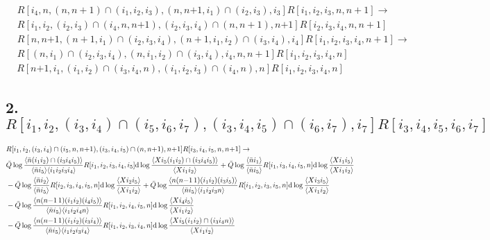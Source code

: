 \documentclass{article}
\begin{document}
\begin{align*}
        &R[i_{4},n,(n,n{+}1)\cap(i_{1},i_{2},i_{3}),(n,n{+1},i_{1})\cap(i_{2},i_{3}),i_{3}] R[i_{1},i_{2},i_{3},n,n{+}1]\to \\
        &R[i_{1},i_{2},(i_{2},i_{3})\cap(i_{4},n,n{+1}),(i_{2},i_{3},i_{4})\cap(n,n{+}1),n{+1}] R[i_{2},i_{3},i_{4},n,n{+}1] 
\end{align*}
\begin{align*}
    &R[n,n{+1},(n{+}1,i_{1})\cap(i_{2},i_{3},i_{4}),(n{+}1,i_{1},i_{2})\cap(i_{3},i_{4}),i_{4}]R[i_{1},i_{2},i_{3},i_{4},n{+}1] \to \\
    &R[(n,i_{1})\cap(i_{2},i_{3},i_{4}),(n,i_{1},i_{2})\cap(i_{3},i_{4}),i_{4},n,n{+}1]R[i_{1},i_{2},i_{3},i_{4},n]
\end{align*}
\begin{align*}
    R[n{+1},i_{1},(i_{1},i_{2})\cap(i_{3},i_{4},n),(i_{1},i_{2},i_{3})\cap(i_{4},n),n] R[i_{1},i_{2},i_{3},i_{4},n]
\end{align*}
\subsection*{2. $R[i_{1},i_{2},(i_{3},i_{4})\cap(i_{5},i_{6},i_{7}),(i_{3},i_{4},i_{5})\cap(i_{6},i_{7}),i_{7}]R[i_{3},i_{4},i_{5},i_{6},i_{7}]$}
\begin{align*}
    &R[i_{1},i_{2},(i_{3},i_{4})\cap(i_{5},n,n{+1}),(i_{3},i_{4},i_{5})\cap(n,n{+}1),n{+}1]R[i_{3},i_{4},i_{5},n,n{+}1] \to \\
    &\bar{Q}\log\frac{\langle\bar{n} (i_{1}i_{2})\cap(i_{3}i_{4}i_{5})\rangle}{\langle\bar{n}{i_{5}}\rangle\langle i_{1}i_{2}i_{3}i_{4}\rangle} R[i_{1},i_{2},i_{3},i_{4},i_{5}] \mathrm{d}\log\frac{\langle Xi_{5}(i_{1}i_{2})\cap(i_{3}i_{4}i_{5})\rangle}{\langle X i_{1}i_{2} \rangle}
    +\bar{Q}\log\frac{\langle\bar{n}i_{1}\rangle}{\langle\bar{n}i_{5}\rangle} R[i_{1},i_{3},i_{4},i_{5},n] \mathrm{d}\log\frac{\langle X i_{1}i_{5}\rangle}{\langle X i_{1}i_{2}\rangle} \\
    &-\bar{Q}\log\frac{\langle\bar{n}i_{2}\rangle}{\langle\bar{n}i_{5}\rangle} R[i_{2},i_{3},i_{4},i_{5},n] \mathrm{d}\log\frac{\langle X i_{2}i_{5}\rangle}{\langle X i_{1}i_{2}\rangle} 
    +\bar{Q}\log\frac{\langle n(n{-1}\,1)(i_{1}i_{2})(i_{3}i_{5})\rangle}{\langle\bar{n}i_{5}\rangle\langle i_{1}i_{2}i_{3}n\rangle} R[i_{1},i_{2},i_{3},i_{5},n] \mathrm{d}\log\frac{\langle X i_{3}i_{5}\rangle}{\langle Xi_{1}i_{2}\rangle} \\
    &-\bar{Q}\log\frac{\langle n(n{-1}\,1)(i_{1}i_{2})(i_{4}i_{5})\rangle}{\langle\bar{n}i_{5}\rangle\langle i_{1}i_{2}i_{4}n\rangle} R[i_{1},i_{2},i_{4},i_{5},n] \mathrm{d}\log\frac{\langle X i_{4}i_{5}\rangle}{\langle Xi_{1}i_{2}\rangle} \\
    &-\bar{Q}\log\frac{\langle n(n{-}1\,1)(i_{1}i_{2})(i_{3}i_{4})\rangle}{\langle \bar{n}i_{5}\rangle\langle i_{1}i_{2}i_{3}i_{4}\rangle} R[i_{1},i_{2},i_{3},i_{4},n]\mathrm{d}\log\frac{\langle Xi_{5}(i_{1}i_{2})\cap(i_{3}i_{4}n)\rangle}{\langle Xi_{1}i_{2}\rangle}
\end{align*}
\end{document}

